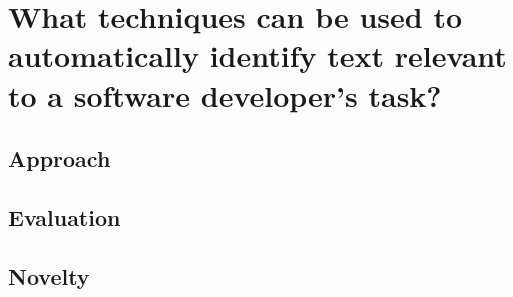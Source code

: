 

\section{What techniques can be used to automatically identify text relevant to a software developer's task?}



\subsection{Approach}



\subsection{Evaluation}



\subsection{Novelty}